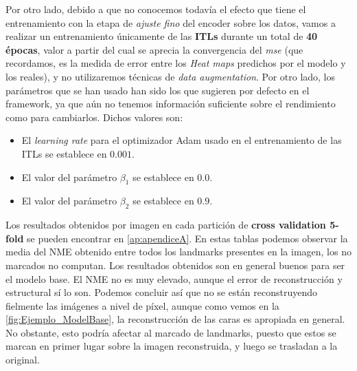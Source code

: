         \medskip

        \noindent Por otro lado, debido a que no conocemos todavía el efecto que tiene el entrenamiento con la etapa de \textit{ajuste fino} del encoder sobre los datos, vamos a realizar un entrenamiento únicamente de las \textbf{ITLs} durante un total de \textbf{40 épocas}, valor a partir del cual se aprecia la convergencia del \textit{mse} (que recordamos, es la medida de error entre los \textit{Heat maps} predichos por el modelo y los reales), y no utilizaremos técnicas de \textit{data augmentation}. Por otro lado, los parámetros que se han usado han sido los que sugieren por defecto en el framework, ya que aún no tenemos información suficiente sobre el rendimiento como para cambiarlos. Dichos valores son: 

        \begin{itemize}
            \item El \textit{learning rate} para el optimizador Adam usado en el entrenamiento de las ITLs se establece en $0.001$. 
            \item El valor del parámetro $\beta_1$ se establece en $0.0$.
            \item El valor del parámetro $\beta_2$ se establece en $0.9$.
        \end{itemize}

        \noindent Los resultados obtenidos por imagen en cada partición de \textbf{cross validation 5-fold } se pueden encontrar en \autoref{ap:apendiceA}. En estas tablas podemos observar la media del NME obtenido entre todos los landmarks presentes en la imagen, los no marcados no computan. Los resultados obtenidos son en general buenos para ser el modelo base. El NME no es muy elevado, aunque el error de reconstrucción y estructural sí lo son. Podemos concluir así que no se están reconstruyendo fielmente las imágenes a nivel de píxel, aunque como vemos en la \autoref{fig:Ejemplo_ModelBase}, la reconstrucción de las caras es apropiada en general. No obstante, esto podría afectar al marcado de landmarks, puesto que estos se marcan en primer lugar sobre la imagen reconstruida, y luego se trasladan a la original.

